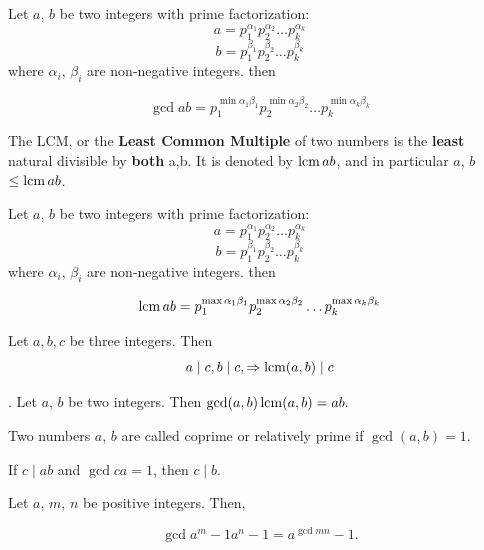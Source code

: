 \begin{theorem}
    Let $a$, $b$ be two integers with prime factorization:
    \[a=p_1^{\alpha_1}p_2^{\alpha_2}\dots p_k^{\alpha_k}\]
    \[b=p_1^{\beta_1}p_2^{\beta_2}\dots p_k^{\beta_k}\]
    where $\alpha_i$, $\beta_i$ are non-negative integers. then
    
    \[\gcd{a}{b}=p_1^{\min{\alpha_1}{\beta_1}}p_2^{\min{\alpha_2}{\beta_2}}\dots p_k^{\min{\alpha_k}{\beta_k}}\]
\end{theorem}

\begin{definition}
    The LCM, or the \textbf{Least Common Multiple} of two numbers is the \textbf{least} natural divisible by \textbf{both} a,b. It is denoted
by $\operatorname*{lcm}{a}{b}$, and in particular $a$, $b$ $\leq \operatorname*{lcm}{a}{b}$.
\end{definition}

\begin{definition}[LCM]
    Let $a$, $b$ be two integers with prime factorization:
    \[a=p_1^{\alpha_1}p_2^{\alpha_2}\dots p_k^{\alpha_k}\]
    \[b=p_1^{\beta_1}p_2^{\beta_2}\dots p_k^{\beta_k}\]
    where $\alpha_i$, $\beta_i$ are non-negative integers. then
    
    \[\operatorname*{lcm}{a}{b}=p_1^{\max{\alpha_1}{\beta_1}}p_2^{\max{\alpha_2}{\beta_2}}\dots p_k^{\max{\alpha_k}{\beta_k}}\]
\end{definition}

\begin{lemma}

Let $a,b,c$ be three integers. Then
\[a\mid c, b\mid c,\Rightarrow \operatorname*{lcm}(a,b) \mid c
\]

\end{lemma}

\begin{theorem}. 
    Let $a$, $b$ be two integers. Then
        $\gcd(a, b) \operatorname*{lcm}(a, b) = ab.$
\end{theorem}

\begin{definition}
    Two numbers $a$, $b$ are called coprime or relatively prime if $\gcd(a, b) = 1$.
\end{definition}

\begin{lemma}
    If $c \mid ab$ and $\gcd{c}{a}=1$, then $c \mid b$.
\end{lemma}

\begin{lemma}
    Let $a$, $m$, $n$ be positive integers. Then,

    \[\gcd{a^{m} - 1}{a^{n} - 1} = a^{\gcd{m}{n}} - 1.\]

\end{lemma}


